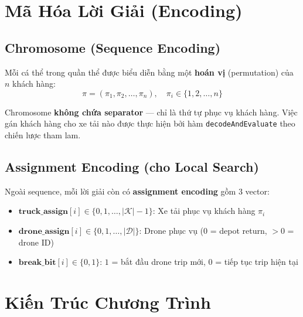 \documentclass[12pt,a4paper]{article}
\begin{document}
\section{Mã Hóa Lời Giải (Encoding)}

\subsection{Chromosome (Sequence Encoding)}

Mỗi cá thể trong quần thể được biểu diễn bằng một \textbf{hoán vị} (permutation) của $n$ khách hàng:
\begin{equation}
    \pi = (\pi_1, \pi_2, \ldots, \pi_n), \quad \pi_i \in \{1, 2, \ldots, n\}
\end{equation}

Chromosome \textbf{không chứa separator} --- chỉ là thứ tự phục vụ khách hàng. Việc gán khách hàng cho xe tải nào được thực hiện bởi hàm \texttt{decodeAndEvaluate} theo chiến lược tham lam.

\subsection{Assignment Encoding (cho Local Search)}

Ngoài sequence, mỗi lời giải còn có \textbf{assignment encoding} gồm 3 vector:
\begin{itemize}[nosep]
    \item $\mathbf{truck\_assign}[i] \in \{0, 1, \ldots, |\mathcal{K}|-1\}$: Xe tải phục vụ khách hàng $\pi_i$
    \item $\mathbf{drone\_assign}[i] \in \{0, 1, \ldots, |\mathcal{D}|\}$: Drone phục vụ ($0$ = depot return, $>0$ = drone ID)
    \item $\mathbf{break\_bit}[i] \in \{0, 1\}$: $1$ = bắt đầu drone trip mới, $0$ = tiếp tục trip hiện tại
\end{itemize}

\section{Kiến Trúc Chương Trình}
\end{document}
